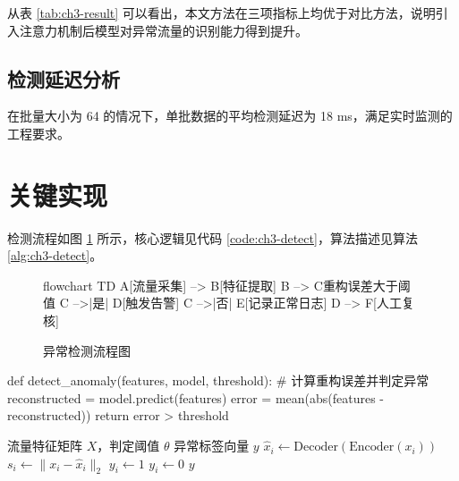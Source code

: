 从表 \ref{tab:ch3-result} 可以看出，本文方法在三项指标上均优于对比方法，说明引入注意力机制后模型对异常流量的识别能力得到提升。

\subsection{检测延迟分析}

在批量大小为 64 的情况下，单批数据的平均检测延迟为 18 ms，满足实时监测的工程要求。

\section{关键实现}

检测流程如图 \ref{fig:ch3-flow} 所示，核心逻辑见代码 \ref{code:ch3-detect}，算法描述见算法 \ref{alg:ch3-detect}。

\begin{figure}[htbp]
  \centering
  \begin{xuptmermaid}[0.85\linewidth]
flowchart TD
  A[流量采集] --> B[特征提取]
  B --> C{重构误差大于阈值}
  C -->|是| D[触发告警]
  C -->|否| E[记录正常日志]
  D --> F[人工复核]
  \end{xuptmermaid}
  \caption{异常检测流程图}
  \label{fig:ch3-flow}
\end{figure}

\begin{xuptcode}[language=Python,caption={异常检测核心逻辑},label={code:ch3-detect}]
def detect_anomaly(features, model, threshold):
    # 计算重构误差并判定异常
    reconstructed = model.predict(features)
    error = mean(abs(features - reconstructed))
    return error > threshold
\end{xuptcode}

\begin{algorithm}[htbp]
  \caption{基于自编码器的异常检测算法}
  \label{alg:ch3-detect}
  \begin{algorithmic}[1]
    \Require 流量特征矩阵 $X$，判定阈值 $\theta$
    \Ensure 异常标签向量 $y$
      \State $\hat{x}_i \gets \mathrm{Decoder}(\mathrm{Encoder}(x_i))$
      \State $s_i \gets \|x_i - \hat{x}_i\|_2$
        \State $y_i \gets 1$
      \Else
        \State $y_i \gets 0$
      \EndIf
    \EndFor
    \State \Return $y$
  \end{algorithmic}
\end{algorithm}
